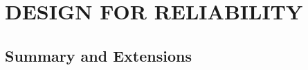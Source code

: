 \chapter{DESIGN FOR RELIABILITY}\label{chap:16}


\section{Summary and Extensions}


\begin{exercises}
    \begin{exercise}
    \label{}
    
    \end{exercise}
    \begin{solution}
    \end{solution}

\end{exercises}